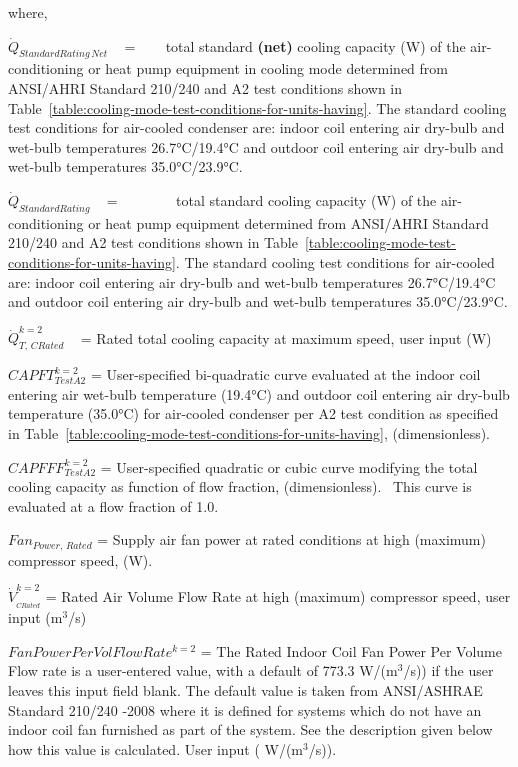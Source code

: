 where,

\({\dot Q_{StandardRating\,Net}}\) ~ = ~~~ total standard \textbf{(net)} cooling capacity (W) of the air-conditioning or heat pump equipment in cooling mode determined from ANSI/AHRI Standard 210/240 and A2 test conditions shown in Table~\ref{table:cooling-mode-test-conditions-for-units-having}. The standard cooling test conditions for air-cooled condenser are: indoor coil entering air dry-bulb and wet-bulb temperatures 26.7°C/19.4°C and outdoor coil entering air dry-bulb and wet-bulb temperatures 35.0°C/23.9°C.

\({\dot Q_{StandardRating}}\) ~ = ~~~~~~~ total standard cooling capacity (W) of the air-conditioning or heat pump equipment determined from ANSI/AHRI Standard 210/240 and A2 test conditions shown in Table~\ref{table:cooling-mode-test-conditions-for-units-having}. The standard cooling test conditions for air-cooled are: indoor coil entering air dry-bulb and wet-bulb temperatures 26.7°C/19.4°C and outdoor coil entering air dry-bulb and wet-bulb temperatures 35.0°C/23.9°C.

\(\dot Q_{T,\,CRated}^{k = 2}\) ~ = Rated total cooling capacity at maximum speed, user input (W)

\(CAPFT_{TestA2}^{k = 2}\) = User-specified bi-quadratic curve evaluated at the indoor coil entering air wet-bulb temperature (19.4°C) and outdoor coil entering air dry-bulb temperature (35.0°C) for air-cooled condenser per A2 test condition as specified in Table~\ref{table:cooling-mode-test-conditions-for-units-having}, (dimensionless).

\(CAPFFF_{TestA2}^{k = 2}\) = User-specified quadratic or cubic curve modifying the total cooling capacity as function of flow fraction, (dimensionless).~ This curve is evaluated at a flow fraction of 1.0.

\(Fa{n_{Power,\,Rated}}\) = Supply air fan power at rated conditions at high (maximum) compressor speed, (W).

\(\dot V_{_{CRated}}^{k = 2}\) = Rated Air Volume Flow Rate at high (maximum) compressor speed, user input (m\(^{3}\)/s)

\(FanPowerPerVolFlowRat{e^{k = 2}}\) = The Rated Indoor Coil Fan Power Per Volume Flow rate is a user-entered value, with a default of 773.3 W/(m\(^{3}\)/s)) if the user leaves this input field blank. The default value is taken from ANSI/ASHRAE Standard 210/240 -2008 where it is defined for systems which do not have an indoor coil fan furnished as part of the system. See the description given below how this value is calculated. User input ( W/(m\(^{3}\)/s)).


